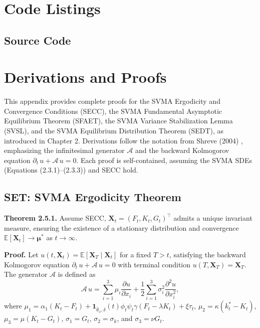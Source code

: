 \documentclass[12pt]{report}
\begin{document}
\appendix

\chapter{Code Listings}

\section{Source Code}

\chapter{Derivations and Proofs}

This appendix provides complete proofs for the SVMA Ergodicity and Convergence Conditions (SECC), the SVMA Fundamental Asymptotic Equilibrium Theorem (SFAET), the SVMA Variance Stabilization Lemma (SVSL), and the SVMA Equilibrium Distribution Theorem (SEDT), as introduced in Chapter 2. Derivations follow the notation from Shreve (2004) \cite{shreve2004}, emphasizing the infinitesimal generator \(\mathcal{A}\) and the backward Kolmogorov equation \(\partial_t\,u + \mathcal{A}\,u = 0\). Each proof is self-contained, assuming the SVMA SDEs (Equations (2.3.1)--(2.3.3)) and SECC hold.

\section{SET: SVMA Ergodicity Theorem}

\textbf{Theorem 2.5.1.} Assume SECC, \(\mathbf{X}_t = (F_t, K_t, G_t)^\top\) admits a unique invariant measure, ensuring the existence of a stationary distribution and convergence \(\mathbb{E}[\mathbf{X}_t] \to \boldsymbol{\mu}^*\) as \(t \to \infty\).

\vspace{0.2in}

\textbf{Proof.} Let \(u(t, \mathbf{X}_t) = \mathbb{E}[\mathbf{X}_T \mid \mathbf{X}_t]\) for a fixed \(T > t\), satisfying the backward Kolmogorov equation \(\partial_t\,u + \mathcal{A}\,u = 0\) with terminal condition \(u(T, \mathbf{X}_T) = \mathbf{X}_T\). The generator \(\mathcal{A}\) is defined as
\[
    \mathcal{A}\,u = \sum_{i=1}^3 \mu_i \frac{\partial u}{\partial x_i} + \frac{1}{2} \sum_{i=1}^3 \sigma_i^2 \frac{\partial^2 u}{\partial x_i^2},
\]
where \(\mu_1 = \alpha_1 (K_t - F_t) + \mathbf{1}_{\hat{\theta}_\omega, \delta}(t) \phi_t \psi_t \gamma (F_t - \lambda K_t) + \xi \tau_t\), \(\mu_2 = \kappa (k_t^* - K_t)\), \(\mu_3 = \mu (K_t - G_t)\), \(\sigma_1 = G_t\), \(\sigma_2 = \sigma_k\), and \(\sigma_3 = \nu G_t\).
\end{document}
